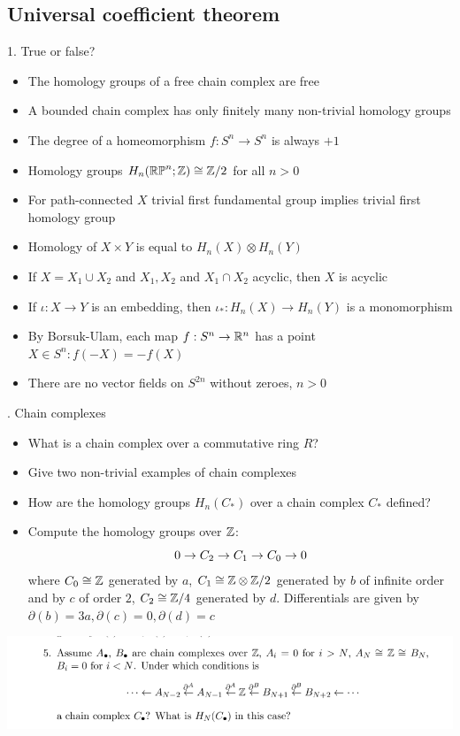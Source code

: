 \subsection{Universal coefficient theorem}

1. True or false?

\begin{itemize}
    \item The homology groups of a free chain complex are free
    \item A bounded chain complex has only finitely many non-trivial homology groups
    \item The degree of a homeomorphism $f:S^n\rightarrow S^n$ is always $+1$
    \item Homology groups $H_n(\mathbb{RP}^n;\mathbb{Z}) \cong \mathbb{Z}/2$ for all $n>0$
    \item For path-connected $X$ trivial first fundamental group implies trivial first homology group
    \item Homology of $X\times Y$ is equal to $H_n(X)\otimes H_n(Y)$
    \item If $X=X_1\cup X_2$ and $X_1,X_2$ and $X_1\cap X_2$ acyclic, then $X$ is acyclic
    \item If $\iota : X\rightarrow Y$ is an embedding, then $\iota_*:H_n(X)\rightarrow H_n(Y)$ is a monomorphism
    \item By Borsuk-Ulam, each map $f:S^n\rightarrow \mathbb{R}^n$ has a point $X\in S^n : f(-X)=-f(X)$
    \item There are no vector fields on $S^{2n}$ without zeroes, $n>0$
\end{itemize}
. Chain complexes

\begin{itemize}
    \item What is a chain complex over a commutative ring $R$?
    \item Give two non-trivial examples of chain complexes
    \item How are the homology groups $H_n(C_*)$ over a chain complex $C_*$ defined?
    \item Compute the homology groups over $\mathbb{Z}$:
    $$0\rightarrow C_2 \rightarrow C_1 \rightarrow C_0 \rightarrow 0$$
    where $C_0\cong \mathbb{Z}$ generated by $a$, $C_1\cong \mathbb{Z}\otimes \mathbb{Z}/2$ generated by $b$ of infinite order and by $c$ of order $2$, $C_2\cong \mathbb{Z}/4$ generated by $d$. Differentials are given by $\partial(b)=3a, \partial(c)=0, \partial (d)=c$
\end{itemize}
\includegraphics[]{image.png}

